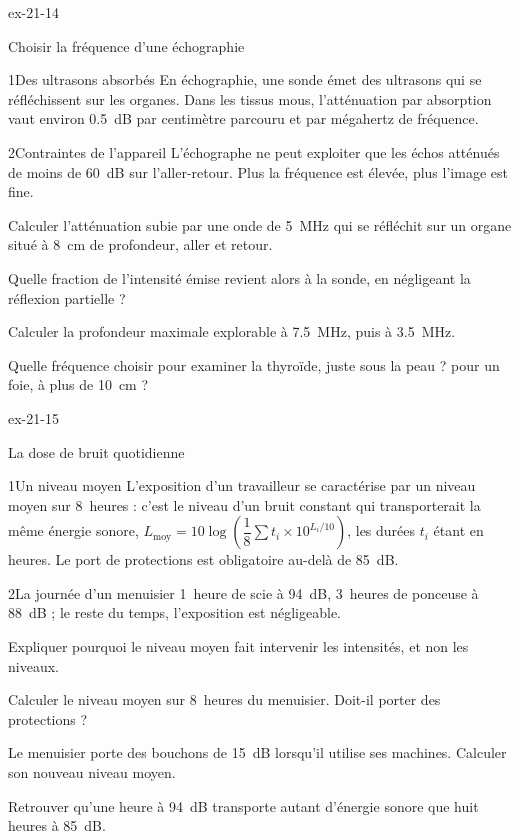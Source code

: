 \begin{blocLivre}{ex-21-14}
\begin{exercice}[3]{Choisir la fréquence d'une échographie}
\begin{docu}{1}{Des ultrasons absorbés}
En échographie, une sonde émet des ultrasons qui se réfléchissent sur les organes. Dans les tissus mous, l'atténuation
par absorption vaut environ \qty{0,5}{dB} par centimètre parcouru et par mégahertz de fréquence.
\end{docu}
\begin{docu}{2}{Contraintes de l'appareil}
L'échographe ne peut exploiter que les échos atténués de moins de \qty{60}{dB} sur l'aller-retour. Plus la fréquence est
élevée, plus l'image est fine.
\end{docu}
\begin{questions}
\item Calculer l'atténuation subie par une onde de \qty{5}{MHz} qui se réfléchit sur un organe situé à \qty{8}{cm} de
profondeur, aller et retour.
\item Quelle fraction de l'intensité émise revient alors à la sonde, en négligeant la réflexion partielle ?
\item \initiative Calculer la profondeur maximale explorable à \qty{7,5}{MHz}, puis à \qty{3,5}{MHz}.
\item Quelle fréquence choisir pour examiner la thyroïde, juste sous la peau ? pour un foie, à plus de \qty{10}{cm} ?
\end{questions}
\end{exercice}
\end{blocLivre}
\begin{blocLivre}{ex-21-15}
\begin{exercice}[3]{La dose de bruit quotidienne}
\begin{docu}{1}{Un niveau moyen}
L'exposition d'un travailleur se caractérise par un niveau moyen sur 8~heures : c'est le niveau d'un bruit constant qui
transporterait la même énergie sonore, $L_\mathrm{moy}=10\log\left(\dfrac{1}{8}\sum t_i\times10^{L_i/10}\right)$, les durées $t_i$
étant en heures. Le port de protections est obligatoire au-delà de \qty{85}{dB}.
\end{docu}
\begin{docu}{2}{La journée d'un menuisier}
1~heure de scie à \qty{94}{dB}, 3~heures de ponceuse à \qty{88}{dB} ; le reste du temps, l'exposition est négligeable.
\end{docu}
\begin{questions}
\item Expliquer pourquoi le niveau moyen fait intervenir les intensités, et non les niveaux.
\item Calculer le niveau moyen sur 8~heures du menuisier. Doit-il porter des protections ?
\item \initiative Le menuisier porte des bouchons de \qty{15}{dB} lorsqu'il utilise ses machines. Calculer son nouveau
niveau moyen.
\item Retrouver qu'une heure à \qty{94}{dB} transporte autant d'énergie sonore que huit heures à \qty{85}{dB}.
\end{questions}
\end{exercice}
\end{blocLivre}
